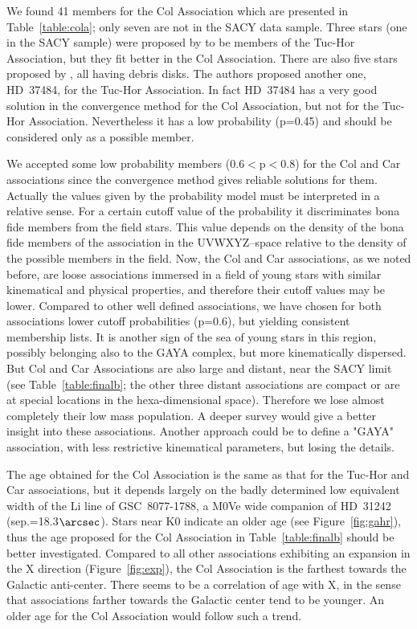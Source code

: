\documentclass[11pt,twoside]{book}
\begin{document}
We found 41 members for the Col Association which are presented in Table~\ref{table:cola};
only seven are not in the SACY data sample.
Three stars (one in the SACY sample) were proposed by \citet{zuckerman04}
to be members of the Tuc-Hor Association, but they fit better in the Col Association.
There are also five stars proposed by \citet{moor06}, all having debris disks.
The authors proposed another one, HD~37484, for the Tuc-Hor Association.
In fact HD~37484 has a very good solution in the convergence method for the Col Association,
but not for the Tuc-Hor Association.
Nevertheless it has a low probability (p=0.45) and should be considered only as a possible member.

We accepted some low probability members (0.6$<$p$<$0.8) for the Col
and Car associations since the convergence method gives reliable
solutions for them.  Actually the values given by the probability
model must be interpreted in a relative sense.  For a certain cutoff
value of the probability it discriminates bona fide members from the
field stars.  This value depends on the density of the bona fide
members of the association in the UVWXYZ--space relative to the
density of the possible members in the field.  Now, the Col and Car
associations, as we noted before, are loose associations immersed in a
field of young stars with similar kinematical and physical properties,
and therefore their cutoff values may be lower.  Compared to other
well defined associations, we have chosen for both associations lower
cutoff probabilities (p=0.6), but yielding consistent membership
lists.  It is another sign of the sea of young stars in this region,
possibly belonging also to the GAYA complex, but more kinematically
dispersed.  But Col and Car Associations are also large and distant,
near the SACY limit (see Table~\ref{table:finalb}; the other three
distant associations are compact or are at special locations in the
hexa-dimensional space).  Therefore we lose almost completely their low
mass population.  A deeper survey would give a better insight into these
associations.  Another approach could be to define a "GAYA"
association, with less restrictive kinematical parameters, but losing
the details.

The age obtained for the Col Association is the same as that for the Tuc-Hor and Car
associations, but it depends largely on the badly determined low equivalent width
of the Li line of GSC~8077-1788, a M0Ve wide companion of HD~31242 (sep.=18.3$\arcsec$).
Stars near K0 indicate  an older age  (see Figure~\ref{fig:gahr}),
thus the age proposed for the  Col Association in  Table~\ref{table:finalb} should be better investigated.
Compared to all other associations exhibiting an expansion in the X direction
(Figure~\ref{fig:exp}), the Col Association is the farthest towards the Galactic anti-center.
There seems to be a correlation of age with X,
in the sense that associations farther towards the Galactic center tend to be younger.
An older age for the Col Association would follow such a trend.
\end{document}
